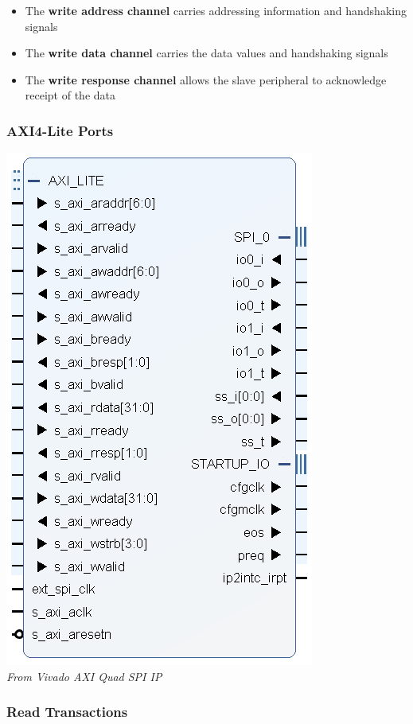 \begin{itemize}
\tightlist
\item
  The \textbf{write address channel} carries addressing information and
  handshaking signals
\item
  The \textbf{write data channel} carries the data values and
  handshaking signals
\item
  The \textbf{write response channel} allows the slave peripheral to
  acknowledge receipt of the data
\end{itemize}

\hypertarget{axi4-lite-ports}{%
\subsubsection{AXI4-Lite Ports}\label{axi4-lite-ports}}

\includegraphics{images/axi_lite_block_diagram.png}\\
\emph{From Vivado AXI Quad SPI IP}

\hypertarget{read-transactions}{%
\subsubsection{Read Transactions}\label{read-transactions}}

